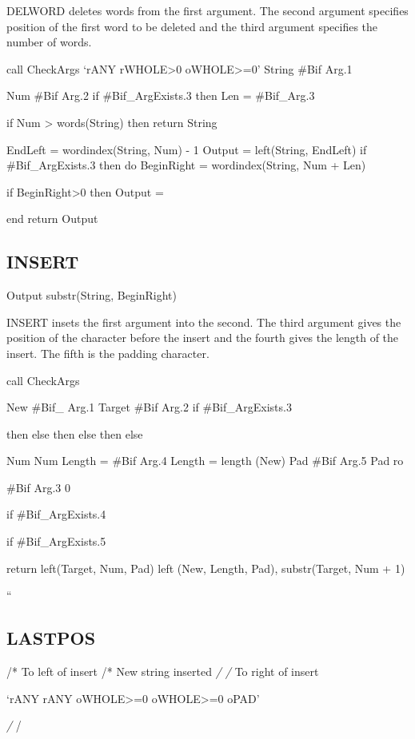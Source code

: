 DELWORD deletes words from the first argument. The second argument
specifies position of the first word to be deleted and the third
argument specifies the number of words.

call CheckArgs `rANY rWHOLE\textgreater0 oWHOLE\textgreater=0' String
\#Bif Arg.1

Num \#Bif Arg.2 if \#Bif\_ArgExists.3 then Len = \#Bif\_Arg.3

if Num \textgreater{} words(String) then return String

EndLeft = wordindex(String, Num) - 1 Output = left(String, EndLeft) if
\#Bif\_ArgExists.3 then do BeginRight = wordindex(String, Num + Len)

if BeginRight\textgreater0 then Output =

end return Output

\subsection{INSERT}\label{insert}

Output \textbar\textbar{} substr(String, BeginRight)

INSERT insets the first argument into the second. The third argument
gives the position of the character before the insert and the fourth
gives the length of the insert. The fifth is the padding character.

call CheckArgs

New \#Bif\_ Arg.1 Target \#Bif Arg.2 if \#Bif\_ArgExists.3

then else then else then else

Num Num Length = \#Bif Arg.4 Length = length (New) Pad \#Bif Arg.5 Pad
ro

\#Bif Arg.3 0

if \#Bif\_ArgExists.4

if \#Bif\_ArgExists.5

return left(Target, Num, Pad) left (New, Length, Pad), substr(Target,
Num + 1)

``

\subsection{LASTPOS}\label{lastpos}

/* To left of insert /* New string inserted \emph{/ /} To right of
insert

`rANY rANY oWHOLE\textgreater=0 oWHOLE\textgreater=0 oPAD'

\emph{/ }/

